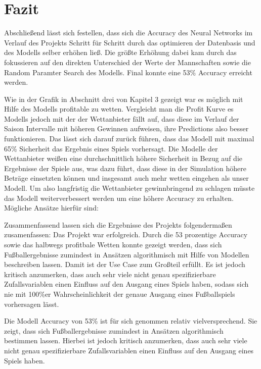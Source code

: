 \chapter{Fazit}

Abschließend lässt sich festellen, dass sich die Accuracy des Neural Networks
im Verlauf des Projekts Schritt für Schritt durch das optimieren der Datenbasis
und des Modells selber erhöhen ließ. Die größte Erhöhung dabei kam durch das fokussieren
auf den direkten Unterschied der Werte der Mannschaften sowie die Random Paramter Search
des Modells. Final konnte eine 53\% Accuracy erreicht werden.

Wie in der Grafik in Abschnitt drei von Kapitel 3 gezeigt war es möglich mit Hilfe
des Modells profitable zu wetten. Vergleicht man die Profit Kurve es Modells jedoch
mit der der Wettanbieter fällt auf, dass diese im Verlauf der Saison Intervalle mit
höheren Gewinnen aufweisen, ihre Predictions also besser funktionieren. Das lässt sich
darauf zurück führen, dass das Modell mit maximal 65\% Sicherheit das Ergebnis eines Spiels
vorhersagt. Die Modelle der Wettanbieter weißen eine durchschnittlich höhere Sicherheit in Bezug auf die
Ergebnisse der Spiele aus, was dazu führt, dass diese in der Simulation höhere Beträge
einsetzten können und insgesamt auch mehr wetten eingehen als unser Modell.
Um also langfristig die Wettanbieter gewinnbringend zu schlagen müsste das Modell
weiterverbessert werden um eine höhere Accuracy zu erhalten. Mögliche Ansätze hierfür
sind:

Zusammenfassend lassen sich die Ergebnisse des Projekts folgendermaßen zusamenfassen:
Das Projekt war erfolgreich. Durch die 53 prozentige Accuracy sowie das halbwegs
profitbale Wetten konnte gezeigt werden, dass sich Fußballergebnisse zumindest in
Ansätzen algorithmisch mit Hilfe von Modellen beschreiben lassen. Damit ist der Use
Case zum Großteil erfüllt. Es ist jedoch kritisch anzumerken, dass auch sehr viele
nicht genau spezifizierbare Zufallsvariablen einen Einfluss auf den Ausgang
eines Spiels haben, sodass sich nie mit 100\%er Wahrscheinlichkeit der genaue Ausgang
eines Fußballspiels vorhersagen lässt.


Die Modell Accuracy von 53\% ist für sich genommen relativ vielversprechend.
Sie zeigt, dass sich Fußballergebnisse zumindest in Ansätzen algorithmisch
bestimmen lassen. Hierbei ist jedoch kritisch anzumerken, dass auch sehr viele nicht genau
spezifizierbare Zufallsvariablen einen Einfluss auf den Ausgang eines Spiels haben.



